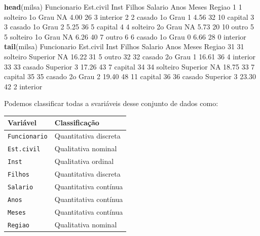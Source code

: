 \documentclass[10pt,a4paper]{book}
\newenvironment{Shaded}{\begin{snugshade}}{\end{snugshade}}
\newcommand{\KeywordTok}[1]{\textcolor[rgb]{0.13,0.29,0.53}{\textbf{#1}}}
\newcommand{\DecValTok}[1]{\textcolor[rgb]{0.00,0.00,0.81}{#1}}
\newcommand{\FloatTok}[1]{\textcolor[rgb]{0.00,0.00,0.81}{#1}}
\newcommand{\OtherTok}[1]{\textcolor[rgb]{0.56,0.35,0.01}{#1}}
\newcommand{\NormalTok}[1]{#1}
\begin{document}
\begin{Shaded}
\begin{Highlighting}[]
\KeywordTok{head}\NormalTok{(milsa)}
\NormalTok{  Funcionario Est.civil    Inst Filhos Salario Anos Meses   Regiao}
\DecValTok{1}           \DecValTok{1}\NormalTok{  solteiro 1o Grau     }\OtherTok{NA}    \FloatTok{4.00}   \DecValTok{26}     \DecValTok{3}\NormalTok{ interior}
\DecValTok{2}           \DecValTok{2}\NormalTok{    casado 1o Grau      }\DecValTok{1}    \FloatTok{4.56}   \DecValTok{32}    \DecValTok{10}\NormalTok{  capital}
\DecValTok{3}           \DecValTok{3}\NormalTok{    casado 1o Grau      }\DecValTok{2}    \FloatTok{5.25}   \DecValTok{36}     \DecValTok{5}\NormalTok{  capital}
\DecValTok{4}           \DecValTok{4}\NormalTok{  solteiro 2o Grau     }\OtherTok{NA}    \FloatTok{5.73}   \DecValTok{20}    \DecValTok{10}\NormalTok{    outro}
\DecValTok{5}           \DecValTok{5}\NormalTok{  solteiro 1o Grau     }\OtherTok{NA}    \FloatTok{6.26}   \DecValTok{40}     \DecValTok{7}\NormalTok{    outro}
\DecValTok{6}           \DecValTok{6}\NormalTok{    casado 1o Grau      }\DecValTok{0}    \FloatTok{6.66}   \DecValTok{28}     \DecValTok{0}\NormalTok{ interior}
\KeywordTok{tail}\NormalTok{(milsa)}
\NormalTok{   Funcionario Est.civil     Inst Filhos Salario Anos Meses   Regiao}
\DecValTok{31}          \DecValTok{31}\NormalTok{  solteiro Superior     }\OtherTok{NA}   \FloatTok{16.22}   \DecValTok{31}     \DecValTok{5}\NormalTok{    outro}
\DecValTok{32}          \DecValTok{32}\NormalTok{    casado  2o Grau      }\DecValTok{1}   \FloatTok{16.61}   \DecValTok{36}     \DecValTok{4}\NormalTok{ interior}
\DecValTok{33}          \DecValTok{33}\NormalTok{    casado Superior      }\DecValTok{3}   \FloatTok{17.26}   \DecValTok{43}     \DecValTok{7}\NormalTok{  capital}
\DecValTok{34}          \DecValTok{34}\NormalTok{  solteiro Superior     }\OtherTok{NA}   \FloatTok{18.75}   \DecValTok{33}     \DecValTok{7}\NormalTok{  capital}
\DecValTok{35}          \DecValTok{35}\NormalTok{    casado  2o Grau      }\DecValTok{2}   \FloatTok{19.40}   \DecValTok{48}    \DecValTok{11}\NormalTok{  capital}
\DecValTok{36}          \DecValTok{36}\NormalTok{    casado Superior      }\DecValTok{3}   \FloatTok{23.30}   \DecValTok{42}     \DecValTok{2}\NormalTok{ interior}
\end{Highlighting}
\end{Shaded}

Podemos classificar todas a svariáveis desse conjunto de dados como:

\begin{longtable}[]{@{}ll@{}}
\toprule
Variável & Classificação\tabularnewline
\midrule
\endhead
\texttt{Funcionario} & Quantitativa discreta\tabularnewline
\texttt{Est.civil} & Qualitativa nominal\tabularnewline
\texttt{Inst} & Qualitativa ordinal\tabularnewline
\texttt{Filhos} & Quantitativa discreta\tabularnewline
\texttt{Salario} & Quantitativa contínua\tabularnewline
\texttt{Anos} & Quantitativa contínua\tabularnewline
\texttt{Meses} & Quantitativa contínua\tabularnewline
\texttt{Regiao} & Qualitativa nominal\tabularnewline
\bottomrule
\end{longtable}
\end{document}
